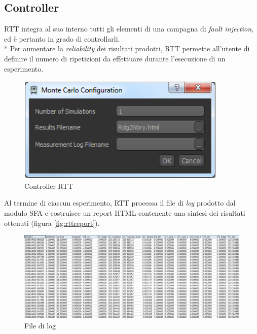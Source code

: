 \subsection{Controller}
RTT integra al suo interno tutti gli elementi di una campagna di \emph{fault injection}, ed \`e pertanto in grado di controllarli.\\*
Per aumentare la \emph{reliability} dei risultati prodotti, RTT permette all'utente di definire il numero di ripetizioni da effettuare durante l'esecuzione di un esperimento.
\begin{figure}[h]
	\centering
	\includegraphics[width=0.7\linewidth]{img/imc}
	\caption{Controller RTT}
	\label{fig:montecarloconfig}
\end{figure}
Al termine di ciascun esperimento, RTT processa il file di \emph{log} prodotto dal modulo SFA e costruisce un report HTML contenente una sintesi dei risultati ottenuti (figura \ref{fig:rttreport}).
\begin{figure}
	\centering
	\includegraphics[width=\linewidth]{img/fusionlog}
	\caption{File di log}
	\label{fig:fusionlog}
\end{figure}
